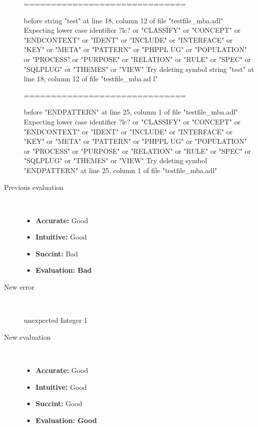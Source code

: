 \begin{description}
\begin{haskell}
==============================

before string "test" at line 18, column 12 of file "testfile_mba.adl"
Expecting lower case identifier ?lc? or "CLASSIFY" or "CONCEPT" or "ENDCONTEXT"
or "IDENT" or "INCLUDE" or "INTERFACE" or "KEY" or "META" or "PATTERN" or "PHPPL
UG" or "POPULATION" or "PROCESS" or "PURPOSE" or "RELATION" or "RULE" or "SPEC"
or "SQLPLUG" or "THEMES" or "VIEW"
Try deleting symbol string "test" at line 18, column 12 of file "testfile_mba.ad
l"

==============================

before "ENDPATTERN" at line 25, column 1 of file "testfile_mba.adl"
Expecting lower case identifier ?lc? or "CLASSIFY" or "CONCEPT" or "ENDCONTEXT"
or "IDENT" or "INCLUDE" or "INTERFACE" or "KEY" or "META" or "PATTERN" or "PHPPL
UG" or "POPULATION" or "PROCESS" or "PURPOSE" or "RELATION" or "RULE" or "SPEC"
or "SQLPLUG" or "THEMES" or "VIEW"
Try deleting symbol "ENDPATTERN" at line 25, column 1 of file "testfile_mba.adl"
\end{haskell}
  \item[Previous evaluation]~\\
    \begin{itemize}
    \item \textbf{Accurate:} Good
    \item \textbf{Intuitive:} Good
    \item \textbf{Succint:} Bad
    \item \textbf{Evaluation: Bad}
    \end{itemize}
  \item[New error]~\\
\begin{haskell}
unexpected Integer 1\end{haskell}
  \item[New evaluation]~\\
    \begin{itemize}
    \item \textbf{Accurate:} Good
    \item \textbf{Intuitive:} Good
    \item \textbf{Succint:} Good
    \item \textbf{Evaluation: Good
}
    \end{itemize}
  \end{description}

\hrulefill


